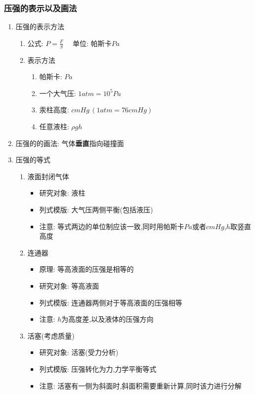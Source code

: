 \documentclass{article}
\begin{document}
\subsubsection{压强的表示以及画法}
\begin{enumerate}
    \item 压强的表示方法
          \begin{enumerate}[label = (\arabic*)]
              \item 公式: $P = \frac{F}{S} \quad $ 单位: 帕斯卡$Pa$
              \item 表示方法
                    \begin{enumerate}
                        \item 帕斯卡: $Pa$
                        \item 一个大气压: $1atm = 10^{5}Pa$
                        \item 汞柱高度: $cmHg \,  (1atm = 76cmHg)$
                        \item 任意液柱: $\rho gh$
                    \end{enumerate}
          \end{enumerate}
    \item 压强的的画法: 气体\textbf{垂直}指向碰撞面
    \item 压强的等式
          \begin{enumerate}[label = (\arabic*)]
              \item 液面封闭气体
                    \begin{itemize}
                        \item 研究对象: 液柱
                        \item 列式模版: 大气压两侧平衡(包括液压)
                        \item 注意: 等式两边的单位制应该一致,同时用帕斯卡$Pa$或者$cmHg$,$h$取竖直高度
                    \end{itemize}
              \item 连通器
                    \begin{itemize}
                        \item 原理: 等高液面的压强是相等的
                        \item 研究对象: 等高液面
                        \item 列式模版: 连通器两侧对于等高液面的压强相等
                        \item 注意: $h$为高度差,以及液体的压强方向
                    \end{itemize}
              \item 活塞(考虑质量)
                    \begin{itemize}
                        \item 研究对象: 活塞(受力分析)
                        \item 列式模版: 压强转化为力,力学平衡等式
                        \item 注意: 活塞有一侧为斜面时,斜面积需要重新计算,同时该力进行分解
                    \end{itemize}
          \end{enumerate}
\end{enumerate}
\end{document}
